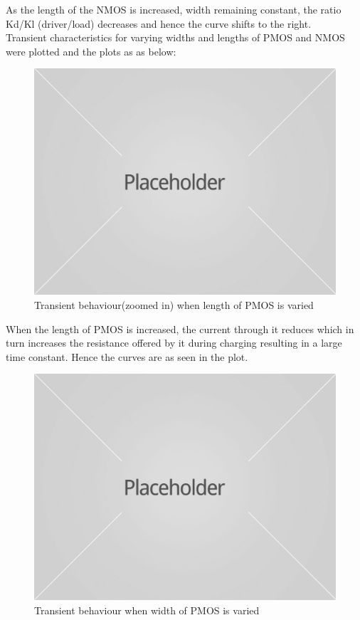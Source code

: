 \documentclass[12pt,a4paper]{article}
\begin{document}
As the length of the NMOS is increased, width remaining constant, the ratio Kd/Kl (driver/load) decreases and hence the curve shifts to the right.\\


Transient characteristics for varying widths and lengths of PMOS and NMOS were plotted and the plots as as below:

\begin{figure}[H]
\begin{center}
\includegraphics[scale=0.20]{placeholder.jpg}
\caption{Transient behaviour(zoomed in) when length of PMOS is varied}
\end{center}
\end{figure}

When the length of PMOS is increased, the current through it reduces which in turn increases the resistance offered by it during charging resulting in a large time constant. Hence the curves are as seen in the plot.

\begin{figure}[H]
\begin{center}
\includegraphics[scale=0.20]{placeholder.jpg}
\caption{Transient behaviour when width of PMOS is varied}
\end{center}
\end{figure}
\end{document}
